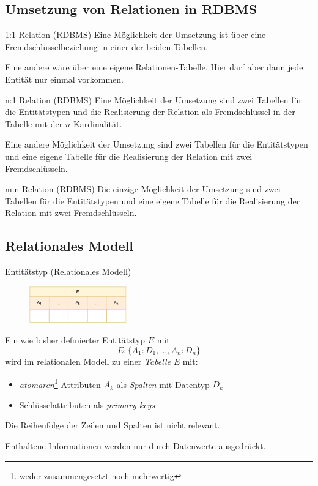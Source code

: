 \subsection{Umsetzung von Relationen in RDBMS}

\begin{bonus}{1:1 Relation (RDBMS)}
    Eine Möglichkeit der Umsetzung ist über eine Fremdschlüsselbeziehung in einer der beiden Tabellen.

    Eine andere wäre über eine eigene Relationen-Tabelle.
    Hier darf aber dann jede Entität nur einmal vorkommen.
\end{bonus}

\begin{bonus}{n:1 Relation (RDBMS)}
    Eine Möglichkeit der Umsetzung sind zwei Tabellen für die Entitätstypen und die Realisierung der Relation als Fremdschlüssel in der Tabelle mit der $n$-Kardinalität.

    Eine andere Möglichkeit der Umsetzung sind zwei Tabellen für die Entitätstypen und eine eigene Tabelle für die Realisierung der Relation mit zwei Fremdschlüsseln.
\end{bonus}

\begin{bonus}{m:n Relation (RDBMS)}
    Die einzige Möglichkeit der Umsetzung sind zwei Tabellen für die Entitätstypen und eine eigene Tabelle für die Realisierung der Relation mit zwei Fremdschlüsseln.
\end{bonus}

\subsection{Relationales Modell}

\begin{defi}{Entitätstyp (Relationales Modell)}
    \begin{figure}
        \begin{center}
            \includegraphics[width=0.375\textwidth]{includes/figures/definition_relational_modell_entity.pdf}
        \end{center}
    \end{figure}
    Ein wie bisher definierter Entitätstyp $E$ mit
    \[
        E: \{ A_1:D_1, \ldots, A_n:D_n \}
    \]
    wird im relationalen Modell zu einer \emph{Tabelle} $E$ mit:
    \begin{itemize}
        \item \emph{atomaren}\footnote{weder zusammengesetzt noch mehrwertig} Attributen $A_k$ als \emph{Spalten} mit Datentyp $D_k$
        \item Schlüsselattributen als \emph{primary keys}
    \end{itemize}

    Die Reihenfolge der Zeilen und Spalten ist nicht relevant.

    Enthaltene Informationen werden nur durch Datenwerte ausgedrückt.
\end{defi}

